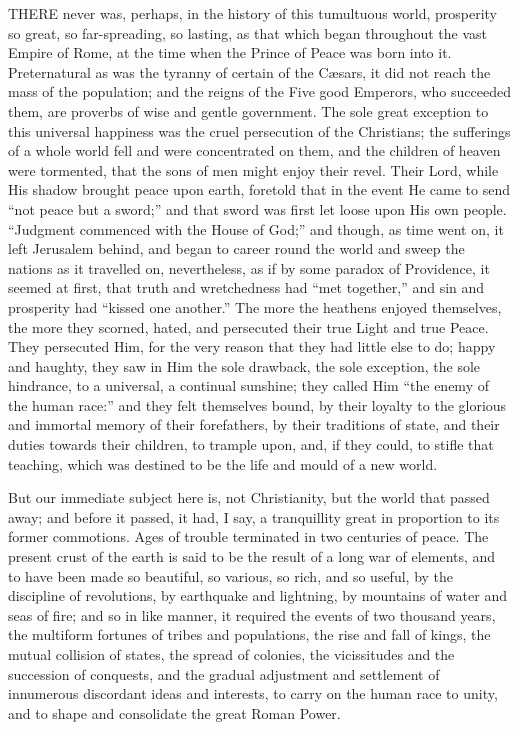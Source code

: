 THERE never was, perhaps, in the
history of this tumultuous world, prosperity so great, so
far-spreading, so lasting, as that which began throughout the vast
Empire of Rome, at the time when the Prince of Peace was born into it.
Preternatural as was the tyranny of certain of the Cæsars, it did not
reach the mass of the population; and the reigns of the Five good
Emperors, who succeeded them, are proverbs of wise and gentle
government. The sole great exception to this universal happiness was
the cruel persecution of the Christians; the sufferings of a whole
world fell and were concentrated on them, and the children of heaven
were tormented, that the sons of men might enjoy their revel. Their
Lord, while His shadow brought peace upon earth, foretold that in the
event He came to send ``not peace but a sword;'' and that
sword was first let loose upon His own people. ``Judgment
commenced with the House of God;'' and though, as time went on, it
left Jerusalem behind, and began to career round the world and sweep
the nations as it travelled on, nevertheless, as if by some paradox of
Providence, it seemed at first, that truth and wretchedness had
``met together,'' and sin and prosperity had ``kissed one
another.'' The more the heathens enjoyed themselves, the more they
scorned, hated, and persecuted their true Light and true Peace.
They persecuted Him, for the very reason that they had little else to
do; happy and haughty, they saw in Him the sole drawback, the sole
exception, the sole hindrance, to a universal, a continual sunshine;
they called Him ``the enemy of the human race:'' and they felt
themselves bound, by their loyalty to the glorious and immortal memory
of their forefathers, by their traditions of state, and their duties
towards their children, to trample upon, and, if they could, to stifle
that teaching, which was destined to be the life and mould of a new
world.

But our immediate subject here is, not Christianity, but the world
that passed away; and before it passed, it had, I say, a tranquillity
great in proportion to its former commotions. Ages of trouble
terminated in two centuries of peace. The present crust of the earth
is said to be the result of a long war of elements, and to have been
made so beautiful, so various, so rich, and so useful, by the
discipline of revolutions, by earthquake and lightning, by mountains
of water and seas of fire; and so in like manner, it required the
events of two thousand years, the multiform fortunes of tribes and
populations, the rise and fall of kings, the mutual collision of
states, the spread of colonies, the vicissitudes and the succession of
conquests, and the gradual adjustment and settlement of innumerous
discordant ideas and interests, to carry on the human race to unity,
and to shape and consolidate the great Roman Power.

